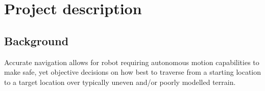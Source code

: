 \documentclass[10pt,fleqn,twoside]{article}
\begin{document}

\mmp

\setcounter{tocdepth}{3} %


\section{Project description}

\subsection{Background}

 Accurate navigation allows for robot requiring autonomous motion capabilities to make safe, yet objective decisions on how best to traverse from a starting location to a target location over typically uneven and/or poorly modelled terrain. \\

\end{document}
